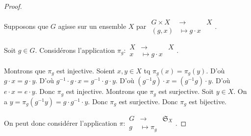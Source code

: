 \documentclass[french]{book}
\theoremstyle{definition}
\theoremstyle{remark}
\begin{document}
\begin{proof}

  \









  Supposons que $G$ agisse sur un ensemble $X$ par $
    \begin{array}{rcl}
    G \times X & \longrightarrow & X \\
    (g,x) & \longmapsto g \cdot x
    \end{array}$.

  Soit $g \in G$. Considérons l'application $\pi_g:
    \begin{array}{rcl}
    X & \longrightarrow & X \\
    x & \longmapsto g \cdot x
    \end{array}$.

  Montrons que $\pi_g$ est injective. Soient $x, y \in X$ tq $\pi_g(x) = \pi_g(y)$. D'où $g \cdot x = g \cdot y$. D'où $g ^{-1}  \cdot g \cdot x = g ^{-1}  \cdot g \cdot y$. D'où $(g ^{-1}  g ) \cdot x = (g ^{-1}  g ) \cdot y$. D'où $e \cdot x = e \cdot y$. Donc $\pi_g$ est injective. Montrons que $\pi_g$ est surjective. Soit $y \in X$. On a $y = \pi_g(g ^{-1}  y) = g \cdot g ^{-1}  \cdot y$. Donc $\pi_g$ est surjective. Donc $\pi_g$ est bijective.

  On peut donc considérer l'application $\pi:
    \begin{array}{rcl}
    G & \longrightarrow & \mathfrak{S}_{X}  \\
    g & \longmapsto \pi_g
    \end{array}$.


\end{proof}
\end{document}
